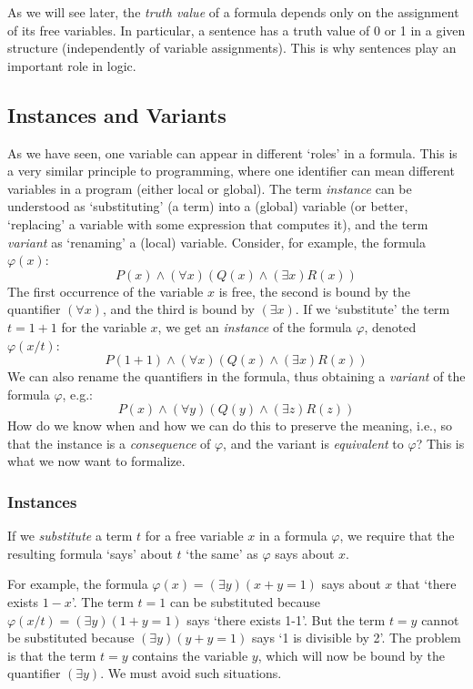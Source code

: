 \begin{remark}
As we will see later, the \emph{truth value} of a formula depends only on the assignment of its free variables. In particular, a sentence has a truth value of 0 or 1 in a given structure (independently of variable assignments). This is why sentences play an important role in logic.
\end{remark}


\subsection{Instances and Variants}

As we have seen, one variable can appear in different `roles' in a formula. This is a very similar principle to programming, where one identifier can mean different variables in a program (either local or global). The term \emph{instance} can be understood as `substituting' (a term) into a (global) variable (or better, `replacing' a variable with some expression that computes it), and the term \emph{variant} as `renaming' a (local) variable. Consider, for example, the formula $\varphi(x)$:
$$
P(x)\land (\forall x)(Q(x) \land (\exists x)R(x))
$$
The first occurrence of the variable $x$ is free, the second is bound by the quantifier $(\forall x)$, and the third is bound by $(\exists x)$. If we `substitute' the term $t=1+1$ for the variable $x$, we get an \emph{instance} of the formula $\varphi$, denoted $\varphi(x/t)$:
$$
P(1+1)\land (\forall x)(Q(x) \land (\exists x)R(x))
$$
We can also rename the quantifiers in the formula, thus obtaining a \emph{variant} of the formula $\varphi$, e.g.:
$$
P(x)\land (\forall y)(Q(y) \land (\exists z)R(z))
$$
How do we know when and how we can do this to preserve the meaning, i.e., so that the instance is a \emph{consequence} of $\varphi$, and the variant is \emph{equivalent} to $\varphi$? This is what we now want to formalize.


\subsubsection{Instances}

If we \emph{substitute} a term $t$ for a free variable $x$ in a formula $\varphi$, we require that the resulting formula `says' about $t$ `the same' as $\varphi$ says about $x$.

\begin{example}
    For example, the formula $\varphi(x)=(\exists y)(x+y=1)$ says about $x$ that `there exists $1-x$'. The term $t=1$ can be substituted because $\varphi(x/t)=(\exists y)(1+y=1)$ says `there exists 1-1'. But the term $t=y$ cannot be substituted because $(\exists y)(y+y=1)$ says `1 is divisible by 2'. The problem is that the term $t=y$ contains the variable $y$, which will now be bound by the quantifier $(\exists y)$. We must avoid such situations.
\end{example}

